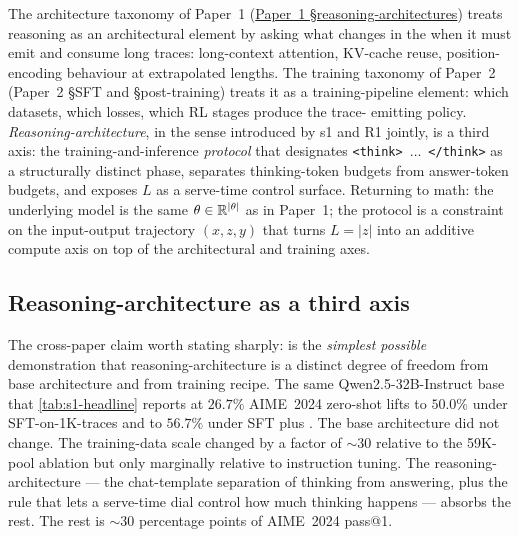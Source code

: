 \begin{intuition}
The architecture taxonomy of Paper~1 (\hyperref[P1-sec:frontier-snapshot]{Paper~1 §reasoning-architectures})
treats reasoning as an architectural element by asking what changes in
the  when it must emit and consume long traces:
long-context attention, KV-cache reuse, position-encoding behaviour at
extrapolated lengths. The training taxonomy of Paper~2 (Paper~2
§SFT and §post-training) treats it as a training-pipeline element:
which datasets, which losses, which RL stages produce the trace-
emitting policy. \emph{Reasoning-architecture}, in the sense
introduced by s1 and R1 jointly, is a third axis: the
training-and-inference \emph{protocol} that designates
\texttt{<think>}~$\ldots$~\texttt{</think>} as a structurally distinct
phase, separates thinking-token budgets from answer-token budgets, and
exposes $L$ as a serve-time control surface. Returning to math: the
underlying model is the same $\theta \in \mathbb{R}^{|\theta|}$ as in
Paper~1; the protocol is a constraint on the input-output trajectory
$(x, z, y)$ that turns $L = |z|$ into an additive compute axis on top
of the architectural and training axes.
\end{intuition}

\subsection{Reasoning-architecture as a third axis}
\label{sec:reasoning-arch-axis}

The cross-paper claim worth stating sharply:  is the
\emph{simplest possible} demonstration that reasoning-architecture is a
distinct degree of freedom from base architecture and from training
recipe. The same Qwen2.5-32B-Instruct base that
\cref{tab:s1-headline} reports at $26.7\%$ AIME~2024 zero-shot lifts
to $50.0\%$ under SFT-on-1K-traces and to $56.7\%$ under SFT plus
 \citep[\S 4.2, \S 5.1]{s1-2025}. The base architecture
did not change. The training-data scale changed by a factor of
$\sim 30$ relative to the 59K-pool ablation but only marginally
relative to instruction tuning. The reasoning-architecture --- the
chat-template separation of thinking from answering, plus the rule
that lets a serve-time dial control how much thinking happens ---
absorbs the rest. The rest is $\sim 30$ percentage points of
AIME~2024 pass@1.

